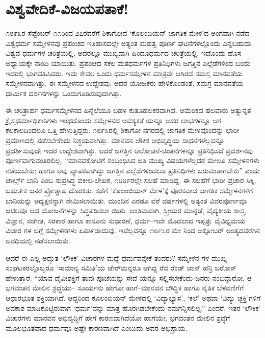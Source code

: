
\chapter{ವಿಶ್ವವೇದಿಕೆ-ವಿಜಯಪತಾಕೆ!}

\noindent

೧೮೯೩ರ ಸೆಪ್ಟೆಂಬರ್ ೧೧ರಿಂದ ೨೭ರವರೆಗೆ ಶಿಕಾಗೋದ ‘ಕೊಲಂಬಿಯನ್ ಜಾಗತಿಕ ಮೇಳ’ದ ಅಂಗವಾಗಿ ನಡೆದ ವಿಶ್ವಧರ್ಮ ಸಮ್ಮೇಳನವು ಪ್ರಪಂಚದ ಇತಿಹಾಸದಲ್ಲೇ ಅತ್ಯಂತ ಮಹತ್ವ ಪೂರ್ಣ ಘಟನೆಗಳಲ್ಲೊಂದು ಎನ್ನಬಹುದು. ವಿಶ್ವದ ಧರ್ಮಗಳ ಚರಿತ್ರೆಯಲ್ಲಿ, ಅದರಲ್ಲೂ ಮುಖ್ಯವಾಗಿ ಹಿಂದೂಧರ್ಮದ ಚರಿತ್ರೆಯಲ್ಲಿ, ಇದೊಂದು ಹೊಸ ಅಧ್ಯಾಯಕ್ಕೇ ನಾಂದಿ ಯಾಯಿತು. ಪ್ರಪಂಚದ ಸಕಲ ಮತಧರ್ಮಗಳ ಪ್ರತಿನಿಧಿಗಳು ಜಗತ್ತಿನ ಎಲ್ಲೆಡೆಗಳಿಂದ ಬಂದು ಇದರಲ್ಲಿ ಭಾಗವಹಿಸಿದರು. ಇದು ಕೇವಲ ಒಂದು ಧರ್ಮಸಮ್ಮೇಳನ ಮಾತ್ರವೇ ಆಗಿರದೆ ಸಮಸ್ತ ಮಾನವತೆಯ ಸಮ್ಮೇಳನವಾಗಿತ್ತು. ಈ ಸಮ್ಮೇಳನದ ಉದ್ದೇಶವು, ಅದರ ಯೋಜಕರು ಹೇಳಿಕೊಂಡಂತೆ, ಸಮಗ್ರ ಮಾನವತೆಯ ಧಾರ್ಮಿಕ ದರ್ಶನಗಳನ್ನು ಒಂದುಗೂಡಿಸುವುದಾಗಿತ್ತು.

ಈ ಚರಿತ್ರಾರ್ಹ ಧರ್ಮಸಮ್ಮೇಳನದ ಹಿನ್ನೆಲೆಯೂ ಬಹಳ ಕುತೂಹಲಕರವಾಗಿದೆ. ಅಮೆರಿಕದ ಹಲವಾರು ಅತ್ಯುನ್ನತ ಕ್ರೈಸ್ತಧರ್ಮಾಧಿಕಾರಿಗಳು ಇಂಥದೊಂದು ಸಮ್ಮೇಳನದ ಆವಶ್ಯಕತೆ ಯನ್ನೂ ಅದರ ಲಾಭಗಳನ್ನೂ ಆಗ ಕೆಲಕಾಲದಿಂದಲೂ ಒತ್ತಿ ಹೇಳುತ್ತಿದ್ದರು. ೧೮೯೩ರಲ್ಲಿ ಶಿಕಾಗೋ ನಗರದಲ್ಲಿ ಜಾಗತಿಕ ಮೇಳವೊಂದನ್ನು ಭಾರೀ ಪ್ರಮಾಣದಲ್ಲಿ ನಡೆಸಬೇಕೆಂದು ನಿಶ್ಚಯವಾಗಿತ್ತು. ಮಾನವನ ಲೌಕಿಕ ಅಭಿವೃದ್ಧಿಯ ಸಾಧನೆಗಳೆಲ್ಲವನ್ನೂ ಪ್ರದರ್ಶಿಸುವುದೇ ಇದರ ಉದ್ದೇಶವಾಗಿತ್ತು. ಆದರೆ ಜಗತ್ತಿನ ಆಲೋಚನೆ-ಚಿಂತನೆಗಳನ್ನೂ ಪ್ರತಿನಿಧಿಸದೆ ಪ್ರದರ್ಶನವು ಪೂರ್ಣವಾಗುವಂತಿರಲಿಲ್ಲ. “ಮಾನವಕೋಟಿಗೆ ಸಂಬಂಧಿಸಿದ ಅತಿ ಮುಖ್ಯ ವಿಷಯಗಳೆಲ್ಲದರ ಮೇಲೂ ಸಮ್ಮೇಳನಗಳು ನಡೆಯಬೇಕು; ಹಾಗೂ ಅವು ವ್ಯಾಪಕವಾಗಿದ್ದು ಜಗತ್ತಿನ ಎಲ್ಲೆಡೆಗಳಿಂದಲೂ ಪ್ರತಿನಿಧಿಗಳು ಬರುವಂತಾಗಬೇಕು” ಎಂದು ಚಾರ್ಲ್ಸ್ ಬಾನಿ ಎಂಬ ಸುಪ್ರಸಿದ್ಧ ವಕೀಲ-ಲೇಖಕ, ೧೮೮೯ರಲ್ಲೇ ಸಲಹೆ ಮಾಡಿದ್ದ. ಈ ಸಲಹೆಗೆ ಭಾರೀ ಪ್ರಚಾರ ಸಿಕ್ಕಿ, ಬಹುತೇಕ ಜನರ ಪ್ರೋತ್ಸಾಹ ದೊರಕಿತು. ಕಡೆಗೆ ‘ಕೊಲಂಬಿಯನ್ ಮೇಳ’ಕ್ಕೆ ಪೂರಕವಾದ ಜಾಗತಿಕ ಸಮ್ಮೇಳನಗಳಿಗೆ ಬಾನಿಯನ್ನು ಅಧ್ಯಕ್ಷನನ್ನಾಗಿ ನೇಮಿಸಲಾಯಿತು. ಮುಂದಿನ ಎರಡೂ ವರೆ ವರ್ಷಗಳಲ್ಲಿ ಅತ್ಯಂತ ವಿವರಪೂರ್ಣವೂ ಜಟಿಲವೂ ಆದ ಯೋಜನೆಗಳನ್ನು ಸಿದ್ಧಪಡಿಸಲಾ ಯಿತು. ಆಂತಿಮವಾಗಿ, ಸ್ತ್ರೀಯರ ಮುನ್ನಡೆ, ವೈದ್ಯಕೀಯ ಶಾಸ್ತ್ರ, ವಿಜ್ಞಾನ, ಸಂಗೀತ, ಸರಕಾರ ಹಾಗೂ ಕಾನೂನು ಸುಧಾರಣೆ, ಧರ್ಮ–ಇವೇ ಮೊದಲಾದ ಇಪ್ಪತ್ತು ವೈವಿಧ್ಯಮಯ ವಿಚಾರ ಗಳ ಬಗ್ಗೆ ಸಮ್ಮೇಳನಗಳು ಏರ್ಪಾಡಾದುವು. ಇವೆಲ್ಲವನ್ನೂ ೧೮೯೩ರ ಮೇ ನಿಂದ ಅಕ್ಟೋಬರ್ ಅಂತ್ಯದವರೆಗಿನ ಅವಧಿಯಲ್ಲಿ ನಡೆಸಲಾಯಿತು.

ಆದರೆ ಈ ಎಲ್ಲ ಅದ್ಭುತ ‘ಲೌಕಿಕ’ ವಿಚಾರಗಳ ಮಧ್ಯೆ ಧರ್ಮವನ್ನೇಕೆ ತಂದರು? ಸಮ್ಮೇಳನ ಗಳ ಮುಖ್ಯ ಸಂಘಟಕರಲ್ಲೊಬ್ಬರೂ ‘ಸಾಮಾನ್ಯ ಸಮಿತಿ’ಯ ಚೇರ್​ಮನ್ನರೂ ಆಗಿದ್ದ ರೆವ ರೆಂಡ್ ಜಾನ್ ಹೆನ್ರಿ ಬರೋಸ್ ಹೇಳುತ್ತಾರೆ: “ಯಾವ ದೈವೀಶಕ್ತಿಗೆ ತಾವು ಪೂಜೆಯನ್ನು ಸೇವೆ ಯನ್ನೂ ಸಲ್ಲಿಸಬೇಕೆಂದು ಜನರು ನಂಬಿದ್ದಾರೋ, ಆ ಭಗವಂತನ ಮೇಲಿನ ಶ್ರದ್ಧೆಯು– ಸೂರ್ಯನು ಹೇಗೋ ಹಾಗೆ–ಮಾನವನ ಬೌದ್ಧಿಕ ಹಾಗೂ ನೈತಿಕ ಬೆಳವಣಿಗೆಗೆ ಆಧಾರಭೂತ ಶಕ್ತಿಯಾಗಿದೆ. ಆದ್ದರಿಂದ ಕೊಲಂಬಿಯನ್ ಮೇಳದಲ್ಲಿ ‘ವಿದ್ಯಾಭ್ಯಾಸ’, ‘ಕಲೆ’ ಅಥವಾ ‘ವಿದ್ಯು ಚ್ಛಕ್ತಿ’ಗಳಿಗೆ ಅವಕಾಶ ಮಾಡಿಕೊಟ್ಟಿರುವಾಗ ‘ಧರ್ಮ’ವನ್ನು ಮಾತ್ರ ಹೊರಗಿಡಬೇಕೆಂದು ನಮಗನ್ನಿಸಲಿಲ್ಲ.” ಎಂದರೆ, ಇತರ ‘ಲೌಕಿಕ’ ವಿಚಾರಗಳು ಮಾನವನ ಅಭಿವೃದ್ಧಿಗೆ ಹೇಗೆ ಕಾರಣವಾಗಿದೆಯೋ ಹಾಗೆಯೇ, ಭಗವಂತನ ಮೇಲಿನ ಶ್ರದ್ಧೆಗೆ ಮೂಲಭೂತವಾದ ಧರ್ಮವೂ ಅಷ್ಟೇ ಕಾರಣವಾಗಿದೆ ಎಂಬುದು ಅವರ ಅಭಿಪ್ರಾಯ.

